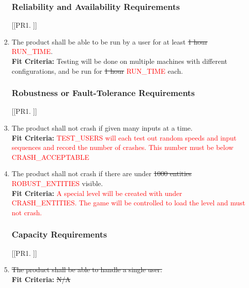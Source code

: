 \documentclass[12pt, titlepage]{article}
\begin{document}
\begin{enumerate}[{PR}1. ]
\subsubsection{Reliability and Availability Requirements}
[{[{PR}1. ]}]
    \item The product shall be able to be run by a user for at least \sout{1 hour} \textcolor{red}{RUN\_TIME}.\\
    \textbf{Fit Criteria:} Testing will be done on multiple machines with different configurations, and be run for \sout{1 hour} \textcolor{red}{RUN\_TIME} each.

\subsubsection{Robustness or Fault-Tolerance Requirements}
[{[{PR}1. ]}]
    \item The product shall not crash if given many inputs at a time.\\
    \textbf{Fit Criteria:} \textcolor{red}{TEST\_USERS will each test out random speeds and input sequences and record the number of crashes. This number must be below CRASH\_ACCEPTABLE}
    \item The product shall not crash if there are under \sout{1000 entities} \textcolor{red}{ROBUST\_ENTITIES} visible.\\
    \textbf{Fit Criteria:} \textcolor{red}{A special level will be created with under CRASH\_ENTITIES. The game will be controlled to load the level and must not crash.}

\subsubsection{Capacity Requirements}
[{[{PR}1. ]}]
    \item \sout{The product shall be able to handle a single user.}\\
    \textbf{Fit Criteria:} \sout{N/A}


\end{enumerate}
\end{document}
